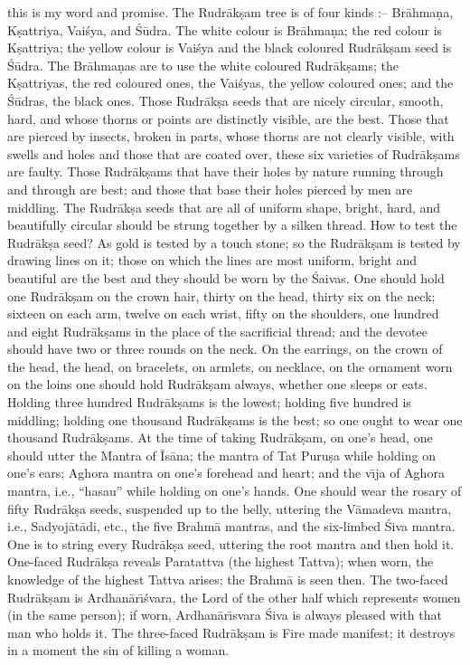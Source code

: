 this is my word and promise. The Rudr\=ak\d{s}am tree is of four kinds :-- Br\=ahma\d{n}a, K\d{s}attriya, Vai\'sya, and \'S\=udra. The white colour is Br\=ahma\d{n}a; the red colour is K\d{s}attriya; the yellow colour is Vai\'sya and the black coloured Rudr\=ak\d{s}am seed is \'S\=udra. The Br\=ahma\d{n}as are to use the white coloured Rudr\=ak\d{s}ams; the K\d{s}attriyas, the red coloured ones, the Vai\'syas, the yellow coloured ones; and the \'S\=udras, the black ones. Those Rudr\=ak\d{s}a seeds that are nicely circular, smooth, hard, and whose thorns or points are distinctly visible, are the best. Those that are pierced by insects, broken in parts, whose thorns are not clearly visible, with swells and holes and those that are coated over, these six varieties of Rudr\=ak\d{s}ams are faulty. Those Rudr\=ak\d{s}ams that have their holes by nature running through and through are best; and those that base their holes pierced by men are middling. The Rudr\=ak\d{s}a seeds that are all of uniform shape, bright, hard, and beautifully circular should be strung together by a silken thread. How to test the Rudr\=ak\d{s}a seed? As gold is tested by a touch stone; so the Rudr\=ak\d{s}am is tested by drawing lines on it; those on which the lines are most uniform, bright and beautiful are the best and they should be worn by the \'Saivas. One should hold one Rudr\=ak\d{s}am on the crown hair, thirty on the head, thirty six on the neck; sixteen on each arm, twelve on each wrist, fifty on the shoulders, one hundred and eight Rudr\=ak\d{s}ams in the place of the sacrificial thread; and the devotee should have two or three rounds on the neck. On the earrings, on the crown of the head, the head, on bracelets, on armlets, on necklace, on the ornament worn on the loins one should hold Rudr\=ak\d{s}am always, whether one sleeps or eats. Holding three hundred Rudr\=ak\d{s}ams is the lowest; holding five hundred is middling; holding one thousand Rudr\=ak\d{s}ams is the best; so one ought to wear one thousand Rudr\=ak\d{s}ams. At the time of taking Rudr\=ak\d{s}am, on one's head, one should utter the Mantra of \=Is\=ana; the mantra of Tat Puru\d{s}a while holding on one's ears; Aghora mantra on one's forehead and heart; and the v\={\i}ja of Aghora mantra, i.e., ``hasau'' while holding on one's hands. One should wear the rosary of fifty Rudr\=ak\d{s}a seeds, suspended up to the belly, uttering the V\=amadeva mantra, i.e., Sadyoj\=at\=adi, etc., the five Brahm\=a mantras, and the six-limbed \'Siva mantra. One is to string every Rudr\=ak\d{s}a seed, uttering the root mantra and then hold it. One-faced Rudr\=ak\d{s}a reveals Paratattva (the highest Tattva); when worn, the knowledge of the highest Tattva arises; the Brahm\=a is seen then. The two-faced Rudr\=ak\d{s}am is Ardhan\=ar\={\i}\'svara, the Lord of the other half which represents women (in the same person); if worn, Ardhan\=ar\={\i}svara \'Siva is always pleased with that man who holds it. The three-faced Rudr\=ak\d{s}am is Fire made manifest; it destroys in a moment the sin of killing a woman.

